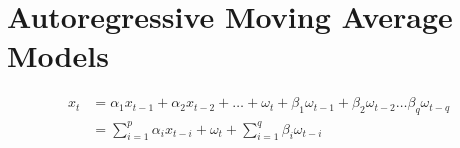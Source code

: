 \documentclass[a4paper,11pt]{article}
\begin{document}
\section{Autoregressive Moving Average Models}
%
\begin{align}
	x_t &= \alpha_1 x_{t-1} + \alpha_2 x_{t-2} + \dots + \omega_t + \beta_1 \omega_{t-1} + \beta_2 \omega_{t-2} \dots \beta_q \omega_{t-q} \nonumber \\
	&= \sum_{i=1}^p \alpha_i x_{t-i} + \omega_t + \sum_{i=1}^q \beta_i \omega_{t-i}
\end{align}
%

\end{document}
